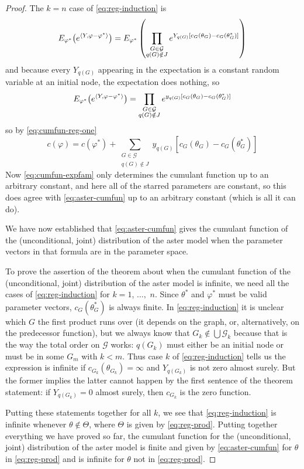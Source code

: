 \begin{proof}
The $k = n$ case of \eqref{eq:reg-induction} is
$$
   E_{\varphi^*}\bigl( e^{\langle Y, \varphi - \varphi^* \rangle} \bigr)
   =
   E_{\varphi^*}\left(
   \prod_{\substack{G \in \mathcal{G} \\ q(G) \notin J}}
   e^{Y_{q(G)} [c_G(\theta_G) - c_G(\theta_G^*)]}
   \right)
$$
and because every $Y_{q(G)}$ appearing in the expectation is a constant
random variable at an initial node, the expectation does nothing, so
$$
   E_{\varphi^*}\bigl( e^{\langle Y, \varphi - \varphi^* \rangle} \bigr)
   =
   \prod_{\substack{G \in \mathcal{G} \\ q(G) \notin J}}
   e^{y_{q(G)} [c_G(\theta_G) - c_G(\theta_G^*)]}
$$
so by \eqref{eq:cumfun-reg-one}
$$
   c(\varphi) = c(\varphi^*)
   + \sum_{\substack{G \in \mathcal{G} \\ q(G) \notin J}}
   y_{q(G)} [c_G(\theta_G) - c_G(\theta_G^*)]
$$
Now \eqref{eq:cumfun-expfam} only determines the cumulant function up
to an arbitrary constant, and here all of the starred parameters are
constant, so this does agree with \eqref{eq:aster-cumfun} up to an
arbitrary constant (which is all it can do).

We have now established that \eqref{eq:aster-cumfun} gives the
cumulant function of the (unconditional, joint) distribution of the
aster model when the parameter vectors in that formula are in the
parameter space.

To prove the assertion of the theorem about when the cumulant function
of the (unconditional, joint) distribution of the aster model is infinite,
we need all the cases of \eqref{eq:reg-induction} for $k = 1$, $\ldots,$ $n$.
Since $\theta^*$ and $\varphi^*$ must be valid parameter vectors,
$c_G(\theta_G^*)$ is always finite.
In \eqref{eq:reg-induction} it is unclear which $G$ the first product
runs over (it depends on the graph, or, alternatively, on the predecessor
function), but we always know that $G_k \notin \bigcup \mathcal{G}_k$
because that is the way the total order on $\mathcal{G}$ works:
$q(G_k)$ must either be an initial node or must be in some $G_m$ with $k < m$.
Thus case $k$ of \eqref{eq:reg-induction} tells us the expression is
infinite if $c_{G_k}(\theta_{G_k}) = \infty$ and $Y_{q(G_k)}$ is not
zero almost surely.  But the former implies the latter cannot happen
by the first sentence of the theorem statement: if $Y_{q(G_k)} = 0$
almost surely, then $c_{G_k}$ is the zero function.

Putting these statements together for all $k$, we see that
\eqref{eq:reg-induction} is infinite whenever $\theta \notin \Theta$,
where $\Theta$ is given by \eqref{eq:reg-prod}.
Putting together everything we have proved so far,
the cumulant function for the (unconditional, joint) distribution of
the aster model is finite and given by \eqref{eq:aster-cumfun} for
$\theta$ in \eqref{eq:reg-prod} and is infinite for
$\theta$ not in \eqref{eq:reg-prod}.


\end{proof}

